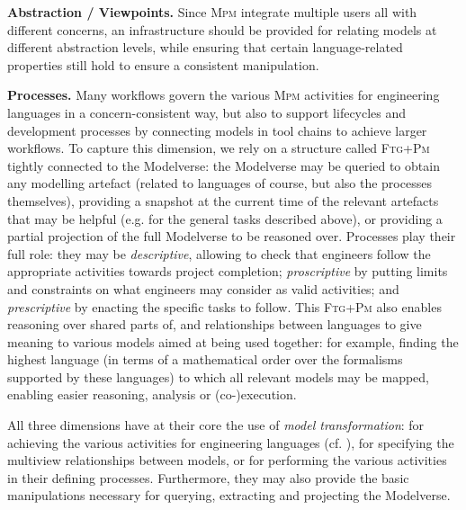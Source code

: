 \noindent
\textbf{Abstraction / Viewpoints.} Since \textsc{Mpm} integrate multiple users 
all with different concerns, an infrastructure should be provided for relating 
models at different abstraction levels, while ensuring that certain 
language-related properties still hold to ensure a consistent manipulation. 

\noindent
\textbf{Processes.} Many workflows govern the various \textsc{Mpm} activities 
for engineering languages in a concern-consistent way, but also to support 
lifecycles and development processes by connecting models in tool chains to 
achieve larger workflows. To capture this dimension, we rely on a structure 
called \textsc{Ftg+Pm} \cite{Mustafiz-etAl:2012} tightly connected to the 
Modelverse: the Modelverse may be queried to obtain any modelling artefact 
(related to languages of course, but also the processes themselves), providing 
a snapshot at the current time of the relevant artefacts that may be helpful 
(e.g. for the general tasks described above), or providing a partial projection 
of the full Modelverse to be reasoned over. Processes play their full role: 
they may be \emph{descriptive}, allowing to check that engineers follow the 
appropriate activities towards project completion; \emph{proscriptive} by 
putting limits and constraints on what engineers may consider as valid 
activities; and \emph{prescriptive} by enacting the specific tasks to follow. 
This \textsc{Ftg+Pm} also enables reasoning over shared parts of, and 
relationships between languages to give meaning to various models aimed at 
being used together: for example, finding the highest language (in terms of a 
mathematical order over the formalisms supported by these languages) to which 
all relevant models may be mapped, enabling easier reasoning, analysis or 
(co-)execution.

All three dimensions have at their core the use of \emph{model transformation}: 
for achieving the various activities for engineering languages (cf. 
\cite{J:Lucio-Amrani-etAl:2014}), for specifying the multiview relationships 
between models, or for performing the various activities in their defining 
processes. Furthermore, they may also provide the basic manipulations necessary 
for querying, extracting and projecting the Modelverse.

